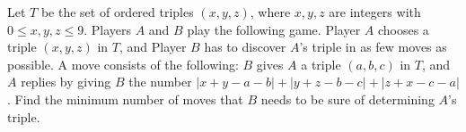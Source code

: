 Let $T$ be the set of ordered triples $(x, y, z)$, where $x, y, z$ are integers with $0 \leq x, y, z \leq 9$. Players $A$ and $B$ play the following game. Player $A$ chooses a triple $(x, y, z)$ in $T$, and Player $B$ has to discover $A$'s triple in as few moves as possible. A move consists of the following: $B$ gives $A$ a triple $(a, b, c)$ in $T$, and $A$ replies by giving $B$ the number $|x + y - a - b| + |y + z - b - c| + |z + x - c - a|$. Find the minimum number of moves that $B$ needs to be sure of determining $A$'s triple.
